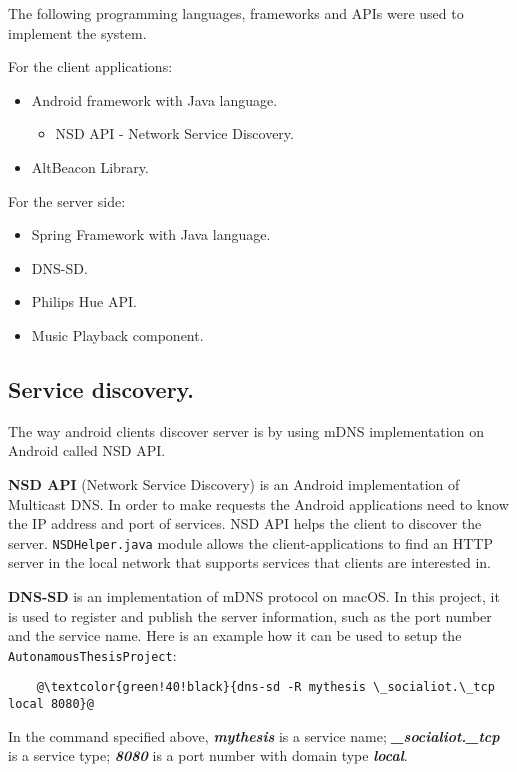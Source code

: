 The following programming languages, frameworks and APIs were used to implement the system.

For the client applications:
\begin{itemize}
    \item Android framework with Java language.
    \begin{itemize}
        \item NSD API - Network Service Discovery.
    \end{itemize}
    \item AltBeacon Library.
\end{itemize}

For the server side:
\begin{itemize}
    \item Spring Framework with Java language.
    \item DNS-SD\@.
    \item Philips Hue API\@.
    \item Music Playback component.
\end{itemize}

\subsection{Service discovery.}
\label{subsec:service-discovery.}
The way android clients discover server is by using mDNS implementation on Android called NSD API.

\textbf{NSD API} (Network Service Discovery) is an Android implementation of Multicast DNS\@.
In order to make requests the Android applications need to know the IP address and port of services.
NSD API helps the client to discover the server.
\texttt{NSDHelper.java} module allows the client-applications to find an HTTP server in the local network that supports
services that clients are interested in.

\textbf{DNS-SD} is an implementation of mDNS protocol on macOS\@.
In this project, it is used to register and publish the server information, such as the port number and the service name.
Here is an example how it can be used to setup the \texttt{AutonamousThesisProject}:
\begin{lstlisting}
    @\textcolor{green!40!black}{dns-sd -R mythesis \_socialiot.\_tcp local 8080}@
\end{lstlisting}
In the command specified above, \textbf{\emph{mythesis}} is a service name;
\textbf{\emph{\_socialiot.\_tcp}} is a service type;
\textbf{\emph{8080}} is a port number with domain type \textbf{\emph{local}}.

